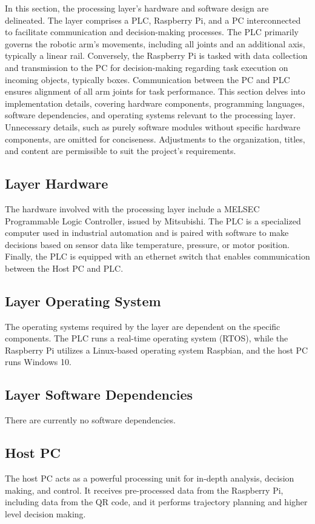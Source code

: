 In this section, the processing layer's hardware and software design are delineated. The layer comprises a PLC, Raspberry Pi, and a PC interconnected to facilitate communication and decision-making processes. The PLC primarily governs the robotic arm's movements, including all joints and an additional axis, typically a linear rail. Conversely, the Raspberry Pi is tasked with data collection and transmission to the PC for decision-making regarding task execution on incoming objects, typically boxes. Communication between the PC and PLC ensures alignment of all arm joints for task performance. This section delves into implementation details, covering hardware components, programming languages, software dependencies, and operating systems relevant to the processing layer. Unnecessary details, such as purely software modules without specific hardware components, are omitted for conciseness. Adjustments to the organization, titles, and content are permissible to suit the project's requirements.


\subsection{Layer Hardware}
The hardware involved with the processing layer include a MELSEC Programmable Logic Controller, issued by Mitsubishi. The PLC is a specialized computer used in industrial automation and is paired with software to make decisions based on sensor data like temperature, pressure, or motor position. Finally, the PLC is equipped with an ethernet switch that enables communication between the Host PC and PLC.
\subsection{Layer Operating System}
The operating systems required by the layer are dependent on the specific components. The PLC runs a real-time operating system (RTOS), while the Raspberry Pi utilizes a Linux-based operating system Raspbian, and the host PC runs Windows 10.


\subsection{Layer Software Dependencies}
There are currently no software dependencies.
\subsection{Host PC}
The host PC acts as a powerful processing unit for in-depth analysis, decision making, and control. It receives pre-processed data from the Raspberry Pi, including data from the QR code, and it performs trajectory planning and higher level decision making.

